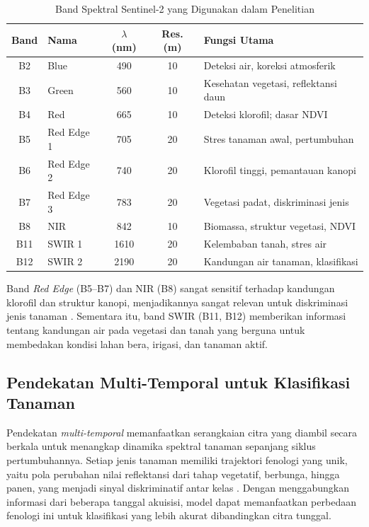 \begin{table}[H]
    \centering
    \caption{Band Spektral Sentinel-2 yang Digunakan dalam Penelitian}
    \label{tab:band_sentinel}
    \begin{tabularx}{\textwidth}{|c|l|c|c|X|}
    \hline
    \textbf{Band} & \textbf{Nama} & \textbf{$\lambda$ (nm)} & \textbf{Res. (m)} & \textbf{Fungsi Utama} \\ \hline
    B2 & Blue & 490 & 10 & Deteksi air, koreksi atmosferik \\ \hline
    B3 & Green & 560 & 10 & Kesehatan vegetasi, reflektansi daun \\ \hline
    B4 & Red & 665 & 10 & Deteksi klorofil; dasar NDVI \\ \hline
    B5 & Red Edge 1 & 705 & 20 & Stres tanaman awal, pertumbuhan \\ \hline
    B6 & Red Edge 2 & 740 & 20 & Klorofil tinggi, pemantauan kanopi \\ \hline
    B7 & Red Edge 3 & 783 & 20 & Vegetasi padat, diskriminasi jenis \\ \hline
    B8 & NIR & 842 & 10 & Biomassa, struktur vegetasi, NDVI \\ \hline
    B11 & SWIR 1 & 1610 & 20 & Kelembaban tanah, stres air \\ \hline
    B12 & SWIR 2 & 2190 & 20 & Kandungan air tanaman, klasifikasi \\ \hline
    \end{tabularx}
\end{table}

Band \textit{Red Edge} (B5--B7) dan NIR (B8) sangat sensitif terhadap kandungan klorofil dan struktur kanopi, menjadikannya sangat relevan untuk diskriminasi jenis tanaman \cite{yi2020}.
Sementara itu, band SWIR (B11, B12) memberikan informasi tentang kandungan air pada vegetasi dan tanah yang berguna untuk membedakan kondisi lahan bera, irigasi, dan tanaman aktif.

\subsection{Pendekatan Multi-Temporal untuk Klasifikasi Tanaman}
Pendekatan \textit{multi-temporal} memanfaatkan serangkaian citra yang diambil secara berkala untuk menangkap dinamika spektral tanaman sepanjang siklus pertumbuhannya.
Setiap jenis tanaman memiliki trajektori fenologi yang unik, yaitu pola perubahan nilai reflektansi dari tahap vegetatif, berbunga, hingga panen, yang menjadi sinyal diskriminatif antar kelas \cite{li2023agri}.
Dengan menggabungkan informasi dari beberapa tanggal akuisisi, model dapat memanfaatkan perbedaan fenologi ini untuk klasifikasi yang lebih akurat dibandingkan citra tunggal.

